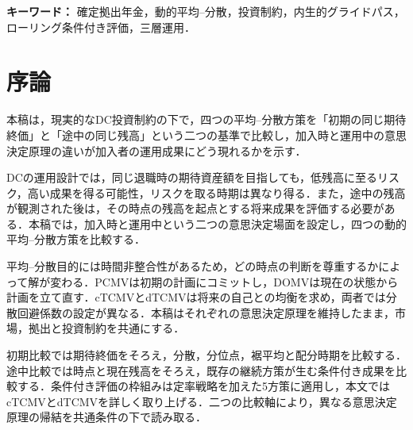 \documentclass[10pt,a4paper]{article}
\theoremstyle{plain}
\theoremstyle{definition}
\begin{document}
\begin{abstract}
\begin{sloppypar}
実務上は，cTCMVを標準デフォルト，DOMVを定期的見直し，dTCMVを総年金富に基づく個別化助言とする三層構造を提案する．PCMVはこれらの運用層には含めず，目標設定と平均--分散のトレードオフを整理する設計ベンチマークとして位置付ける．MVSは独立した第四層に置かず，係数較正，非凹性および数値安定性を追加検証すべき研究拡張として位置付ける．本稿の実務的貢献は，動的最適制御理論と実装可能なDCガバナンスを結び付ける点にある．外生的に設定されたグライドパスの形状を比較するのではなく，加入者利益の追求と実装のしやすさの双方に基づいて，グライドパスを導出，検証，比較し，各実務層へ割り当てる統一的な方法を提示する．数値計算では，共通の後退・前進体系により，方策形状，終端富分布，下方リスクおよび制約拘束を比較する．ローリング条件付き成果指標は，途中時点における低・中・高残高状態からの残存期間成果を同じ尺度で可視化し，各戦略の便益とリスクを加入者状態別に説明可能にする．さらに，モーメント整合性，確率質量保存，格子安定性および四解概念の既存研究との結果比較を通じて，再現性を確保する．
\end{sloppypar}
\end{abstract}

\noindent\textbf{キーワード：} 確定拠出年金，動的平均--分散，投資制約，内生的グライドパス，ローリング条件付き評価，三層運用．
\clearpage\setcounter{tocdepth}{1}{\footnotesize\tableofcontents}\clearpage
\section{序論}
\label{sec:introduction}
本稿は，現実的なDC投資制約の下で，四つの平均--分散方策を「初期の同じ期待終価」と「途中の同じ残高」という二つの基準で比較し，加入時と運用中の意思決定原理の違いが加入者の運用成果にどう現れるかを示す．

DCの運用設計では，同じ退職時の期待資産額を目指しても，低残高に至るリスク，高い成果を得る可能性，リスクを取る時期は異なり得る．また，途中の残高が観測された後は，その時点の残高を起点とする将来成果を評価する必要がある．本稿では，加入時と運用中という二つの意思決定場面を設定し，四つの動的平均--分散方策を比較する．

平均--分散目的には時間非整合性があるため，どの時点の判断を尊重するかによって解が変わる．PCMVは初期の計画にコミットし，DOMVは現在の状態から計画を立て直す．cTCMVとdTCMVは将来の自己との均衡を求め，両者では分散回避係数の設定が異なる．本稿はそれぞれの意思決定原理を維持したまま，市場，拠出と投資制約を共通にする．

初期比較では期待終価をそろえ，分散，分位点，裾平均と配分時期を比較する．途中比較では時点と現在残高をそろえ，既存の継続方策が生む条件付き成果を比較する．条件付き評価の枠組みは定率戦略を加えた5方策に適用し，本文ではcTCMVとdTCMVを詳しく取り上げる．二つの比較軸により，異なる意思決定原理の帰結を共通条件の下で読み取る．
\end{document}
